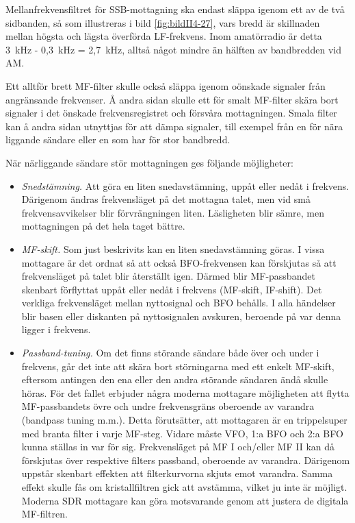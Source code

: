 Mellanfrekvensfiltret för SSB-mottagning ska endast släppa igenom
ett av de två sidbanden, så som illustreras i bild \ref{fig:bildII4-27},
vars bredd är skillnaden mellan högsta och lägsta överförda LF-frekvens.
Inom amatörradio är detta 3~kHz - 0,3~kHz = 2,7~kHz, alltså något mindre än
hälften av bandbredden vid AM.

Ett alltför brett MF-filter skulle också släppa igenom oönskade
signaler från angränsande frekvenser.
Å andra sidan skulle ett för smalt MF-filter skära bort signaler i det
önskade frekvensregistret och försvåra mottagningen.
Smala filter kan å andra sidan utnyttjas för att dämpa signaler, till exempel från
en för nära liggande sändare eller en som har för stor bandbredd.

När närliggande sändare stör mottagningen ges följande möjligheter:
\begin{itemize}
\item \emph{Snedstämning.}
  Att göra en liten snedavstämning, uppåt eller nedåt i frekvens.
  Därigenom ändras frekvensläget på det mottagna talet, men vid små
  frekvensavvikelser blir förvrängningen liten.
  Läsligheten blir sämre, men mottagningen på det hela taget bättre.

\item \emph{MF-skift.}
  Som just beskrivits kan en liten snedavstämning göras.
  I vissa mottagare är det ordnat så att också BFO-frekvensen kan förskjutas
  så att frekvensläget på talet blir återställt igen.
  Därmed blir MF-passbandet skenbart förflyttat uppåt eller nedåt i frekvens
  (MF-skift, IF-shift).
  Det verkliga frekvensläget mellan nyttosignal och BFO behålls.
  I alla händelser blir basen eller diskanten på nyttosignalen avskuren,
  beroende på var denna ligger i frekvens.

\item \emph{Passband-tuning.}
  Om det finns störande sändare både över och under i frekvens, går det inte
  att skära bort störningarna med ett enkelt MF-skift, eftersom antingen den
  ena eller den andra störande sändaren ändå skulle höras.
  För det fallet erbjuder några moderna mottagare möjligheten att flytta
  MF-passbandets övre och undre frekvensgräns oberoende av varandra (bandpass
  tuning m.m.).
  Detta förutsätter, att mottagaren är en trippelsuper med branta filter i
  varje MF-steg.
  Vidare måste VFO, 1:a BFO och 2:a BFO kunna ställas in var för sig.
  Frekvensläget på MF I och/eller MF II kan då förskjutas över respektive
  filters passband, oberoende av varandra.
  Därigenom uppstår skenbart effekten att filterkurvorna skjuts emot varandra.
  Samma effekt skulle fås om kristallfiltren gick att avstämma, vilket ju inte
  är möjligt.
  Moderna SDR mottagare kan göra motsvarande genom att justera de digitala
  MF-filtren.
\end{itemize}

